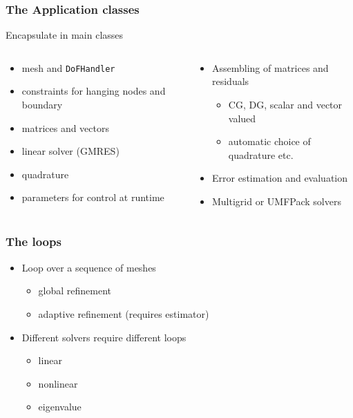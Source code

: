 \begin{frame}
  \frametitle{The Application classes}
  Encapsulate in main classes
  \begin{columns}
    \begin{column}{.5\textwidth}
      \begin{itemize}
      \item mesh and \lstinline!DoFHandler!
      \item constraints for hanging nodes and boundary
      \item matrices and vectors
      \item linear solver (GMRES)
      \item quadrature
      \item parameters for control at runtime
      \end{itemize}
    \end{column}
    \begin{column}{.5\textwidth}
      \begin{itemize}
      \item Assembling of matrices and residuals
        \begin{itemize}
        \item CG, DG, scalar and vector valued
        \item automatic choice of quadrature etc.
        \end{itemize}
      \item Error estimation and evaluation
      \item Multigrid or UMFPack solvers
      \end{itemize}
    \end{column}
  \end{columns}
\end{frame}

\begin{frame}
  \frametitle{The loops}
  \begin{itemize}
  \item Loop over a sequence of meshes
    \begin{itemize}
    \item global refinement
    \item adaptive refinement (requires estimator)
    \end{itemize}
  \item Different solvers require different loops
    \begin{itemize}
    \item linear
    \item nonlinear
    \item eigenvalue
    \end{itemize}
  \end{itemize}
\end{frame}

